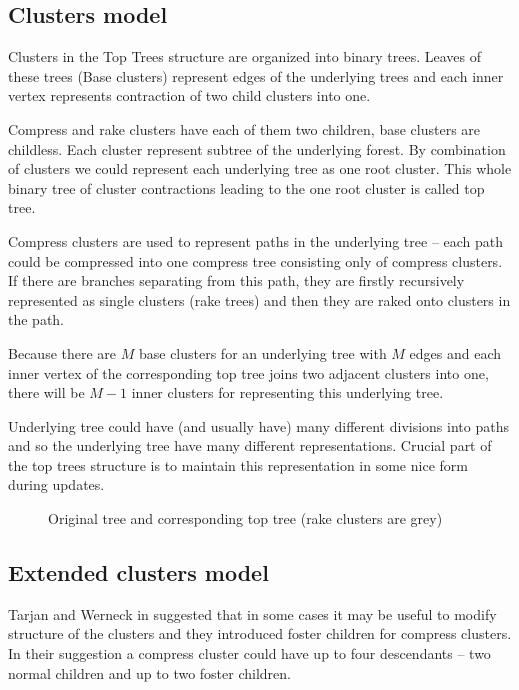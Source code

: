 \subsection{Clusters model}

Clusters in the Top Trees structure are organized into binary trees. Leaves of
these trees (Base clusters) represent edges of the underlying trees and each
inner vertex represents contraction of two child clusters into one.

Compress and rake clusters have each of them two children, base clusters are
childless. Each cluster represent subtree of the underlying forest. By
combination of clusters we could represent each underlying tree as one {\I root
cluster}. This whole binary tree of cluster contractions leading to the one root
cluster is called {\I top tree}.

Compress clusters are used to represent paths in the underlying tree -- each
path could be compressed into one {\I compress tree} consisting only of compress
clusters. If there are branches separating from this path, they are firstly
recursively represented as single clusters ({\I rake trees}) and then they are
{\I raked onto} clusters in the path.

Because there are $M$ base clusters for an underlying tree with $M$ edges and
each inner vertex of the corresponding top tree joins two adjacent clusters into
one, there will be $M-1$ inner clusters for representing this underlying tree.

Underlying tree could have (and usually have) many different divisions into
paths and so the underlying tree have many different representations. Crucial
part of the top trees structure is to maintain this representation in some nice
form during updates.

\begin{figure}[H]
\centering
{}
\caption[Original tree and corresponding top tree]
{Original tree and corresponding top tree (rake clusters are grey)}
\end{figure}

\subsection{Extended clusters model}

Tarjan and Werneck in \cite{SelfAdjustingTT} suggested that in some cases it may
be useful to modify structure of the clusters and they introduced
{\I foster children} for {\I compress clusters}. In their suggestion a compress
cluster could have up to four descendants -- two normal children and up to two
foster children.

